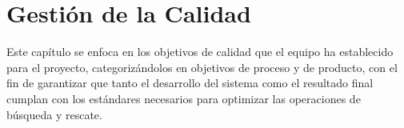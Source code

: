 \chapter{Gestión de la Calidad}\label{ch:gestionDeLaCalidad}

Este capítulo se enfoca en los objetivos de calidad que el equipo ha establecido para el proyecto, categorizándolos en 
objetivos de proceso y de producto, con el fin de garantizar que tanto el desarrollo del sistema como el resultado final 
cumplan con los estándares necesarios para optimizar las operaciones de búsqueda y rescate.













